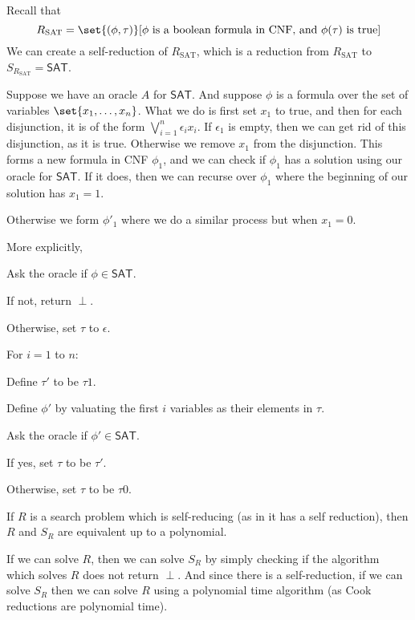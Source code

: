 \documentclass[10pt]{article}
\begin{document}
\def\Rsat{R_{\text{SAT}}}
\def\sat{\mathsf{SAT}}
\begin{exam*}

    Recall that
    \[ \Rsat = \set{(\phi,\tau)}[\text{$\phi$ is a boolean formula in CNF, and $\phi(\tau)$ is true}] \]
    We can create a self-reduction of $\Rsat$, which is a reduction from $\Rsat$ to $S_{\Rsat}=\sat$.

    Suppose we have an oracle $A$ for $\sat$.
    And suppose $\phi$ is a formula over the set of variables $\set{x_1,\dots,x_n}$.
    What we do is first set $x_1$ to true, and then for each disjunction, it is of the form $\bigvee_{i=1}^n\epsilon_ix_i$.
    If $\epsilon_1$ is empty, then we can get rid of this disjunction, as it is true.
    Otherwise we remove $x_1$ from the disjunction.
    This forms a new formula in CNF $\phi_1$, and we can check if $\phi_1$ has a solution using our oracle for $\sat$.
    If it does, then we can recurse over $\phi_1$ where the beginning of our solution has $x_1=1$.

    Otherwise we form $\phi'_1$ where we do a similar process but when $x_1=0$.

    More explicitly,
    \benum
        \item Ask the oracle if $\phi\in\sat$.
        \item If not, return $\perp$.
        \item Otherwise, set $\tau$ to $\epsilon$.
        \item For $i=1$ to $n$:
        \benum
            \item Define $\tau'$ to be $\tau1$.
            \item Define $\phi'$ by valuating the first $i$ variables as their elements in $\tau$.
            \item Ask the oracle if $\phi'\in\sat$.
            \item If yes, set $\tau$ to be $\tau'$.
            \item Otherwise, set $\tau$ to be $\tau0$.
        \eenum
    \eenum

\end{exam*}

\begin{note}

    If $R$ is a search problem which is self-reducing (as in it has a self reduction), then $R$ and $S_R$ are equivalent up to a polynomial.

    If we can solve $R$, then we can solve $S_R$ by simply checking if the algorithm which solves $R$ does not return $\perp$.
    And since there is a self-reduction, if we can solve $S_R$ then we can solve $R$ using a polynomial time algorithm (as Cook reductions are polynomial time).

\end{note}
\end{document}
